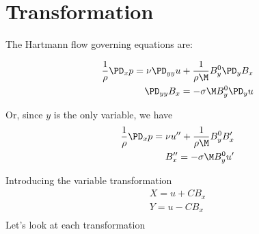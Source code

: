\documentclass[11pt]{article}
\begin{document}
\doublespacing
\MOONSTITLE
\maketitle

\section{Transformation}
The Hartmann flow governing equations are:

\begin{equation}\begin{aligned}
\frac{1}{\rho}\PD_x p = \nu \PD_{yy} u + \frac{1}{\rho \M} B_y^0 \PD_y B_x \\
\PD_{yy} B_x = - \sigma \M B_y^0 \PD_y u \\
\end{aligned} \end{equation}

Or, since $y$ is the only variable, we have
\begin{equation}\begin{aligned}
\frac{1}{\rho}\PD_x p = \nu u'' + \frac{1}{\rho \M} B_y^0 B_x' \\
B_x'' = - \sigma \M B_y^0 u' \\
\end{aligned} \end{equation}

Introducing the variable transformation
\begin{equation}\begin{aligned}
X = u + C B_x \\
Y = u - C B_x \\
\end{aligned} \end{equation}
Let's look at each transformation
\end{document}
